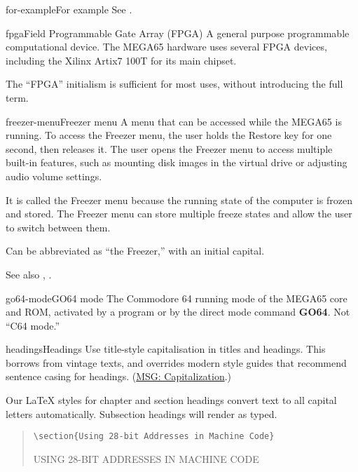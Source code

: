 \begin{sgentry}{for-example}{For example}
    See .
\end{sgentry}

\begin{sgentry}{fpga}{Field Programmable Gate Array (FPGA)}
    A general purpose programmable computational device. The MEGA65 hardware uses several FPGA devices, including the Xilinx Artix7 100T for its main chipset.

    The ``FPGA'' initialism is sufficient for most uses, without introducing the full term.
\end{sgentry}

\begin{sgentry}{freezer-menu}{Freezer menu}
    A menu that can be accessed while the MEGA65 is running. To access the Freezer menu, the user holds the Restore key for one second, then releases it. The user opens the Freezer menu to access multiple built-in features, such as mounting disk images in the virtual drive or adjusting audio volume settings.

    It is called the Freezer menu because the running state of the computer is frozen and stored. The Freezer menu can store multiple freeze states and allow the user to switch between them.

    Can be abbreviated as ``the Freezer,'' with an initial capital.

    See also , .
\end{sgentry}

\begin{sgentry}{go64-mode}{GO64 mode}
    The Commodore 64 running mode of the MEGA65 core and ROM, activated by a program or by the direct mode command \textbf{GO64}. Not ``C64 mode.''
\end{sgentry}

\begin{sgentry}{headings}{Headings}
    Use title-style capitalisation in titles and headings. This borrows from vintage texts, and overrides modern style guides that recommend sentence casing for headings. (\href{https://learn.microsoft.com/en-us/style-guide/capitalization}{MSG: Capitalization}.)

    Our LaTeX styles for chapter and section headings convert text to all capital letters automatically. Subsection headings will render as typed.

    \begin{quote}
        \texttt{{\textbackslash}section\{Using 28-bit Addresses in Machine Code\}}

        \hrulefill

        {\large USING 28-BIT ADDRESSES IN MACHINE CODE}
    \end{quote}
\end{sgentry}


